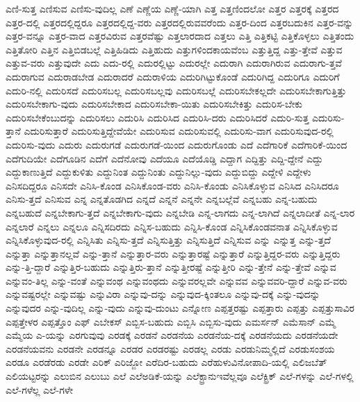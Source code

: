 {ಎಣಿ-ಸುತ್ತ
ಎಣಿಸುವ
ಎಣಿಸು-ವುದಿಲ್ಲ
ಎಣೆ
ಎಣ್ಣೆಯ
ಎಣ್ಣೆ-ಯಾಗಿ
ಎತ್ತ
ಎತ್ತಣಿಂದಲೋ
ಎತ್ತರ
ಎತ್ತರಕ್ಕೆ
ಎತ್ತರದ
ಎತ್ತರ-ದಲ್ಲಿ
ಎತ್ತರದಲ್ಲಿದ್ದರೂ
ಎತ್ತರದಲ್ಲಿದ್ದ-ವರು
ಎತ್ತರದಲ್ಲಿರುವವರೆಂದು
ಎತ್ತರ-ದಿಂದ
ಎತ್ತರಬದುಕಿನ
ಎತ್ತರ-ವನ್ನು
ಎತ್ತರ-ವನ್ನೂ
ಎತ್ತರ-ವಾದ
ಎತ್ತರವಿರುವ
ಎತ್ತರವೆಷ್ಟು
ಎತ್ತಲಾರದಾದ
ಎತ್ತಲು
ಎತ್ತಿ
ಎತ್ತಿಕಟ್ಟಿ
ಎತ್ತಿಕೊಳ್ಳಲು
ಎತ್ತಿತಂದು
ಎತ್ತಿತೋರಿ
ಎತ್ತಿನ
ಎತ್ತಿಬಿಡಬಲ್ಲೆ
ಎತ್ತಿಹಿಡಿದು
ಎತ್ತಿಹುದು
ಎತ್ತುಗಳಿಂದಕಾಯವೆಂಬ
ಎತ್ತುತ್ತಿದ್ದ
ಎತ್ತು-ತ್ತೇವೆ
ಎತ್ತುವ
ಎತ್ತುವ-ವರು
ಎತ್ತುವುದೇ
ಎದು
ಎದು-ರಲ್ಲಿ
ಎದುರಲ್ಲಿಟ್ಟು
ಎದುರಲ್ಲೇ
ಎದುರಾಗಿ
ಎದುರಾಗಿರುವ
ಎದುರಾಗು-ತ್ತವೆ
ಎದುರಾಗುವ
ಎದುರಾಡಬೇಡ
ಎದುರಾದರೆ
ಎದುರಾಳಿಯ
ಎದುರಿಗಿಟ್ಟುಕೊಂಡೆ
ಎದುರಿಗಿದ್ದ
ಎದುರಿಗೂ
ಎದುರಿಗೆ
ಎದುರಿ-ನಲ್ಲಿ
ಎದುರಿಸದೆ
ಎದುರಿಸಬಲ್ಲ
ಎದುರಿಸಬಲ್ಲವು
ಎದುರಿಸಬಲ್ಲೆ
ಎದುರಿಸಬೇಕಲ್ಲದೇ
ಎದುರಿಸಬೇಕಾಗುತ್ತಿತ್ತು
ಎದುರಿಸಬೇಕಾಗು-ವುದು
ಎದುರಿಸಬೇಕಾದ
ಎದುರಿಸಬೇಕಾ-ಯಿತು
ಎದುರಿಸಬೇಕಿತ್ತು
ಎದುರಿಸ-ಬೇಕು
ಎದುರಿಸಬೇಕೆಂಬುದನ್ನು
ಎದುರಿಸಲು
ಎದುರಿಸಿ
ಎದುರಿಸಿದ
ಎದುರಿಸಿ-ದರು
ಎದುರಿಸಿದರೆ
ಎದುರಿ-ಸುತ್ತ
ಎದುರಿಸು-ತ್ತಾನೆ
ಎದುರಿಸುತ್ತಾರೆ
ಎದುರಿಸುತ್ತಿದ್ದೇವೆಯೇ
ಎದುರಿಸುವ
ಎದುರಿಸುವಲ್ಲಿ
ಎದುರಿಸು-ವಾಗ
ಎದುರಿಸುವುದ-ರಲ್ಲಿ
ಎದುರಿಸು-ವುದು
ಎದುರು
ಎದುರುಗಡೆ
ಎದುರುಗಡೆ-ಯಿಂದ
ಎದುರುಗೊಂಡು
ಎದೆ
ಎದೆಗಾರಿಕೆ
ಎದೆಗಾರಿಕೆ-ಯಿಂದ
ಎದೆಗುದಿಯೇ
ಎದೆಗೂಡಿನ
ಎದೆಗೆ
ಎದೆನೋವು
ಎದೆಯೂ
ಎದೆಯೊಡ್ಡಿ
ಎದ್ದಾಗ
ಎದ್ದಿತ್ತು
ಎದ್ದಿ-ದ್ದೇನೆ
ಎದ್ದು
ಎದ್ದುಕಾಣುತ್ತಿದೆ
ಎದ್ದುಕುಳಿತು
ಎದ್ದುನಿಂತ
ಎದ್ದುನಿಂತು
ಎದ್ದುನಿಲ್ಲು-ವುದು
ಎದ್ದುಬಿದ್ದು
ಎದ್ದೇಳಿ
ಎದ್ದೇಳು
ಎನಿಸದಿದ್ದರೂ
ಎನಿಸದೇ
ಎನಿಸಿ-ಕೊಂಡ
ಎನಿಸಿಕೊಂಡ-ವರು
ಎನಿಸಿ-ಕೊಂಡು
ಎನಿಸಿಕೊಳ್ಳುವ
ಎನಿಸಿದ
ಎನಿಸಿದರೂ
ಎನಿಸು-ತ್ತದೆ
ಎನಿಸುವ
ಎನ್ನ
ಎನ್ನತೊಡಗಿದ
ಎನ್ನದೆ
ಎನ್ನನೆ
ಎನ್ನನೇ
ಎನ್ನಬಲ್ಲೆವೆ
ಎನ್ನಬಹು
ಎನ್ನ-ಬಹುದು
ಎನ್ನಬಹುದೆ
ಎನ್ನಬೇಕಾಗು-ತ್ತದೆ
ಎನ್ನಬೇಕಾಗು-ವುದು
ಎನ್ನಬೇಡಿ
ಎನ್ನ-ಲಾಗದು
ಎನ್ನ-ಲಾಗಿದೆ
ಎನ್ನಲಾದೀತೆ
ಎನ್ನ-ಲಾರ
ಎನ್ನಲಾರೆ
ಎನ್ನಲು
ಎನ್ನಲೂ
ಎನ್ನಿಸದಿರದು
ಎನ್ನಿಸ-ಬಹುದು
ಎನ್ನಿಸಿ-ಕೊಂಡ
ಎನ್ನಿಸಿಕೊಂಡವನಾತ
ಎನ್ನಿಸಿಕೊಳ್ಳುವ
ಎನ್ನಿಸಿಕೊಳ್ಳುವುದ-ರಲ್ಲಿ
ಎನ್ನಿಸಿತು
ಎನ್ನಿಸು-ತ್ತದೆ
ಎನ್ನಿಸುತ್ತಿತ್ತು
ಎನ್ನಿಸುತ್ತಿದೆ
ಎನ್ನಿಸುವ
ಎನ್ನು
ಎನ್ನುತ್ತ
ಎನ್ನು-ತ್ತದೆ
ಎನ್ನುತ್ತಾ
ಎನ್ನುತ್ತಾನಲ್ಲವೆ
ಎನ್ನು-ತ್ತಾನೆ
ಎನ್ನುತ್ತಾರ-ವರು
ಎನ್ನುತ್ತಾರಷ್ಟೆ
ಎನ್ನುತ್ತಾರೆ
ಎನ್ನುತ್ತಿದ್ದರ-ವರು
ಎನ್ನುತ್ತಿದ್ದರು
ಎನ್ನು-ತ್ತಿ-ದ್ದಾರೆ
ಎನ್ನುತ್ತಿರ-ಬಹುದು
ಎನ್ನುತ್ತಿರು-ತ್ತಾನೆ
ಎನ್ನುತ್ತೀರಷ್ಟೆ
ಎನ್ನುತ್ತೀರಿ
ಎನ್ನು-ತ್ತೇನೆ
ಎನ್ನು-ತ್ತೇವೆ
ಎನ್ನುವ
ಎನ್ನುವಂ-ತಿಲ್ಲ
ಎನ್ನು-ವಂತೆ
ಎನ್ನುವಂಥ
ಎನ್ನುವಂಥದು
ಎನ್ನುವರಲ್ಲವೇ
ಎನ್ನುವವ
ಎನ್ನುವವರಿ-ದ್ದಾರೆ
ಎನ್ನುವ-ವರು
ಎನ್ನುವಷ್ಟರಲ್ಲೇ
ಎನ್ನುವಷ್ಟು
ಎನ್ನುವಿರಾ
ಎನ್ನುವು-ದನ್ನು
ಎನ್ನುವುದ-ಕ್ಕಿಂತಲೂ
ಎನ್ನುವು-ದಕ್ಕೆ
ಎನ್ನು-ವುದನ್ನು
ಎನ್ನುವುದರ
ಎನ್ನು-ವುದಿಲ್ಲ
ಎನ್ನು-ವುದು
ಎನ್ನುವು-ದುಂಟು
ಎನ್ನೋಣ
ಎಪ್ಪತ್ತರಷ್ಟು
ಎಪ್ಪತ್ತಾರು
ಎಪ್ಪತ್ತು
ಎಪ್ಪತ್ತುಸಾವಿರ
ಎಪ್ಪತ್ತೇಳರ
ಎಪ್ಪತ್ತೊಂ
ಎಫ್
ಎಬೇಕಸ್
ಎಬ್ಬಿಸ-ಬಹುದು
ಎಬ್ಬಿಸಿ
ಎಬ್ಬಿಸು-ವುದು
ಎಮರ್ಸನ್
ಎಮೆಸಾನ್
ಎಮ್ಮೆ
ಎಮ್ಮೆಯ
ಎ-ಯನ್ನು
ಎರಗುವುವು
ಎರಡಕ್ಕೆ
ಎರಡನೆ
ಎರಡನೆಯ
ಎರಡನೆಯ-ದಕ್ಕೆ
ಎರಡನೆಯದು
ಎರಡನೆಯದೇ
ಎರಡನೆಯವನು
ಎರಡನೇ
ಎರಡನ್ನೂ
ಎರಡರ
ಎರಡರಷ್ಟು
ಎರಡಲ್ಲ
ಎರಡು
ಎರಡುನಿಮ್ಮಲ್ಲಿದೆ
ಎರಡುಸಂಶಯ
ಎರಡೂ
ಎರಡೆರಡು
ಎರಡೇ
ಎರಿಕ್
ಎರಿಜ್ಜೋ
ಎರೆದಿರ-ಬಹುದು
ಎರೆಹುಳುವಿನೋಪಾದಿ-ಯಲ್ಲಿ
ಎಲಿಜಬೆತ್
ಎಲಿಯಟ್ಟರನ್ನು
ಎಲುಬಿನ
ಎಲುಬು
ಎಲೆ
ಎಲೆಅಡಿಕೆ-ಯನ್ನು
ಎಲೆಕ್ಟ್ರಾನುಇವೆಲ್ಲವೂ
ಎಲೆಕ್ಟ್ರಿಕ್
ಎಲೆ-ಗಳನ್ನು
ಎಲೆ-ಗಳಲ್ಲಿ
ಎಲೆ-ಗಳೆಲ್ಲ
ಎಲೆ-ಗಳೇ
}
